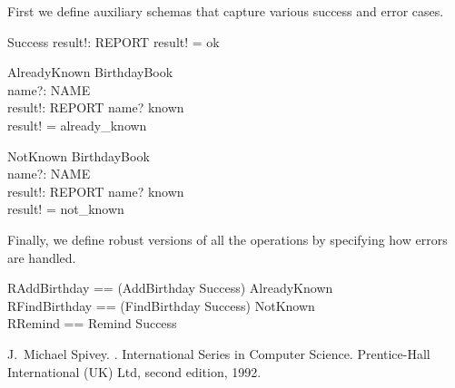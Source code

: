 \documentclass{article}
\begin{document}
First we define auxiliary schemas that capture various success
and error cases.

\begin{schema}{Success}
    result!: REPORT
\where
    result! = ok
\end{schema}

\begin{schema}{AlreadyKnown}
    \Xi BirthdayBook \\
    name?: NAME \\
    result!: REPORT
\where
    name? \in known \\
    result! = already\_known
\end{schema}


\begin{schema}{NotKnown}
    \Xi BirthdayBook \\
    name?: NAME \\
    result!: REPORT
\where
    name? \notin known \\
    result! = not\_known
\end{schema}

Finally, we define robust versions of all the operations
by specifying how errors are handled.  

\begin{zed} 
    RAddBirthday == (AddBirthday \land Success) \lor AlreadyKnown \\
    RFindBirthday == (FindBirthday \land Success) \lor NotKnown \\
    RRemind == Remind \land Success
\end{zed}


\begin{thebibliography}{1}
J.~Michael Spivey.
.
\newblock International Series in Computer Science. Prentice-Hall International
  (UK) Ltd, second edition, 1992.
\end{thebibliography}
\end{document}
